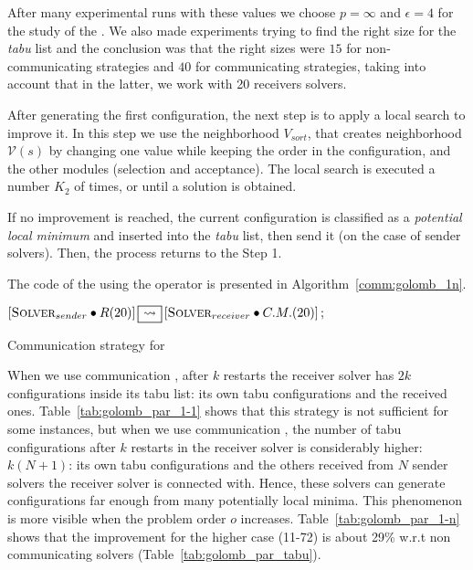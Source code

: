 {After many experimental runs with these values we choose $p = \infty$ and $\epsilon = 4$ for the study of the \commstr. We also made experiments trying to find the right size for the {\it tabu} list and the conclusion was that the right sizes were $15$ for non-communicating strategies and $40$ for communicating strategies, taking into account that in the latter, we work with 20 receivers solvers.


After generating the first configuration, the next step is to apply a local search to improve it. In this step we use the neighborhood \om{} $V_{sort}$, that creates neighborhood $\mathcal{V}\left(s\right)$ by changing one value while keeping the order in the configuration, and the other modules (selection and acceptance). The local search is executed a number $K_2$ of times, or until a solution is obtained.


If no improvement is reached, the current configuration is classified as a {\it potential local minimum} and inserted into the {\it tabu} list, then send it (on the case of sender solvers). Then, the process returns to the Step 1. 
}

The \posl{} code of the \commstr{} using the \oneTn{} operator is presented in Algorithm~\ref{comm:golomb_1n}.

\begin{algorithm}[h]
\dontprintsemicolon
\SetNoline
$\left[\eqsolverposl{sender}\posldot R(20)\right] \oneton \left[\eqsolverposl{receiver}\posldot C.M.(20)\right];$
\caption{Communication strategy \oneTn{} for \GRP}\label{comm:golomb_1n}
\end{algorithm}

When we use communication \oneTone, after $k$ restarts the receiver solver has $2k$ configurations inside its tabu list: its own tabu configurations and the received ones. Table~\ref{tab:golomb_par_1-1} shows that this strategy is not sufficient for some instances, but when we use communication \oneTn, the number of tabu configurations after $k$ restarts in the receiver solver is considerably higher: $k(N+1)$: its own tabu configurations and the others received from $N$ sender solvers the receiver solver is connected with. Hence, these solvers can generate configurations far enough from many potentially local minima.
This phenomenon is more visible when the problem order $o$ increases. Table~\ref{tab:golomb_par_1-n} shows that the improvement for the higher case (11-72) is about 29\% w.r.t non communicating solvers (Table~\ref{tab:golomb_par_tabu}).

